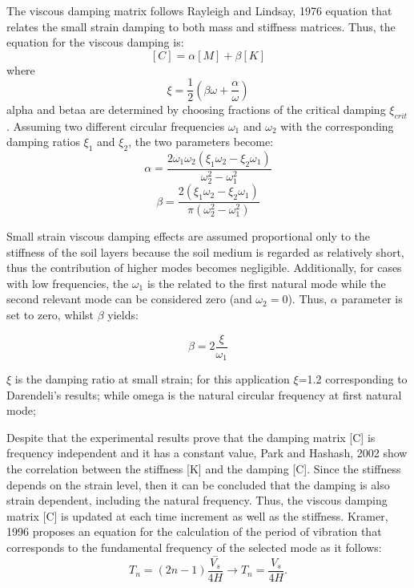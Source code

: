 	The viscous damping matrix follows Rayleigh and Lindsay, 1976 \cite{rayleigh1976theory} equation that relates the small strain damping to both mass and stiffness matrices. Thus, the equation for the viscous damping is:
	\begin{equation}
	\left[C\right]=\alpha\left[M\right]+\beta\left[K\right]
	\end{equation}
	where 
	\begin{equation}
		\xi = \frac{1}{2}(\beta \omega + \frac{\alpha}{\omega})
	\end{equation}
	\gls{alpha} and \gls{betaa} are determined by choosing fractions of the critical damping $\xi_{crit}$. Assuming two different circular frequencies $\omega_1$ and $\omega_2$ with the corresponding damping ratios $\xi_1$ and $\xi_2$, the two parameters become:
	\begin{equation}
		\alpha=\frac{2 \omega_1 \omega_2 (\xi_1 \omega_2 - \xi_2 \omega_1)}{\omega_2^2 - \omega_1^2}
	\end{equation}
	\begin{equation}
		\beta=\frac{2 (\xi_1 \omega_2 - \xi_2 \omega_1)}{\pi (\omega_2^2 - \omega_1^2)}
	\end{equation}
	
	Small strain viscous damping effects are assumed proportional only to the stiffness of the soil layers because the soil medium is regarded as relatively short, thus the contribution of higher modes becomes negligible. Additionally, for cases with low frequencies, the $\omega_1$ is the related to the first natural mode while the second relevant mode can be considered zero (and $\omega_2 = 0$). Thus, $\alpha$ parameter is set to zero, whilst $\beta$ yields:
	
	\begin{equation}
	\beta = 2\frac{\xi}{\omega_1}
	\end{equation}
	
	
	$\xi$ is the damping ratio at small strain; for this application $\xi$=1.2 corresponding to Darendeli's results; while \gls{omega} is the natural circular frequency at first natural mode;
	
	Despite that the experimental results prove that the damping matrix [C] is frequency independent and it has a constant value, Park and Hashash, 2002 \cite{hashash2002viscous} show the correlation between the stiffness [K] and the damping [C]. Since the stiffness depends on the strain level, then it can be concluded that the damping is also strain dependent, including the natural frequency. Thus, the viscous damping matrix [C] is updated at each time increment as well as the stiffness. Kramer, 1996 \cite{kramer1996geotechnical} proposes an equation for the calculation of the period of vibration that corresponds to the fundamental frequency of the selected mode as it follows:
	\begin{equation}
	T_n=(2n-1)\frac{\stackrel{-}{{V}_{s}}}{4H}\longrightarrow T_n=\frac{V_s}{4H}.
	\end{equation}
	
